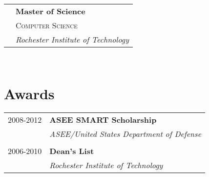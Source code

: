 \documentclass[10pt]{article} %
\begin{document}
{\begin{minipage}[t]{0.44\textwidth}
\begin{tabular}{rl}
	
& \textbf{Master of Science} \\
& \textsc{Computer Science} \\ 
& \textit{Rochester Institute of Technology}\\
 


\end{tabular}\\[10pt]


\section{Awards} 

\begin{tabular}{rl}
2008-2012 & \textbf{ASEE SMART Scholarship}\\
& \textit{ASEE/United States Department of Defense}\\ \\


2006-2010 & \textbf{Dean's List}\\
& \textit{Rochester Institute of Technology}
\end{tabular}\\[10pt]



\end{minipage}}
\end{document}
